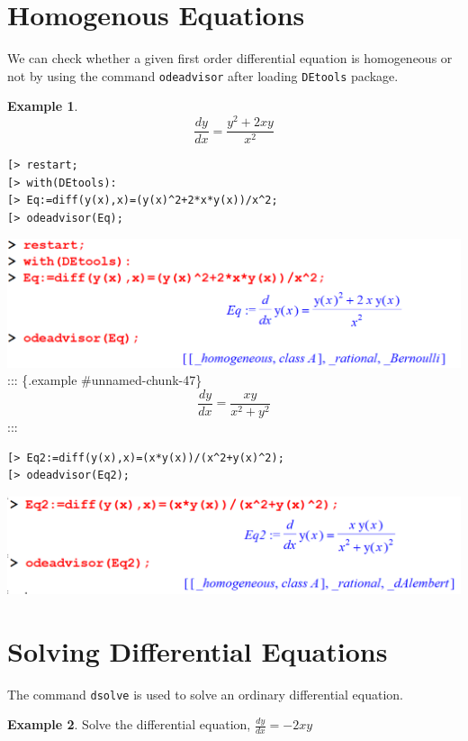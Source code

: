 \documentclass[
]{book}
\theoremstyle{definition}
\theoremstyle{definition}
\newtheorem{example}{Example}[chapter]
\theoremstyle{definition}
\theoremstyle{definition}
\theoremstyle{remark}
\begin{document}
\section{Homogenous Equations}\label{homogenous-equations}

We can check whether a given first order differential equation is homogeneous or not by using the command \texttt{odeadvisor} after loading \texttt{DEtools} package.

\begin{example}
\protect\hypertarget{exm:unnamed-chunk-46}{}\label{exm:unnamed-chunk-46}\[\frac{dy}{dx} = \frac{y^2+2xy}{x^2}\]
\end{example}

\begin{verbatim}
[> restart;
[> with(DEtools):
[> Eq:=diff(y(x),x)=(y(x)^2+2*x*y(x))/x^2;
[> odeadvisor(Eq);
\end{verbatim}

\includegraphics{figures/Diff/Diff 6.2 -4.png}
::: \{.example \#unnamed-chunk-47\}
\[\frac{dy}{dx} = \frac{xy}{x^2+y^2}\]
:::

\begin{verbatim}
[> Eq2:=diff(y(x),x)=(x*y(x))/(x^2+y(x)^2);
[> odeadvisor(Eq2);
\end{verbatim}

\includegraphics{figures/Diff/Diff 6.2 -5.png}

\section{Solving Differential Equations}\label{solving-differential-equations}

The command \texttt{dsolve} is used to solve an ordinary differential equation.

\begin{example}
\protect\hypertarget{exm:unnamed-chunk-48}{}\label{exm:unnamed-chunk-48}Solve the differential equation, \(\frac{dy}{dx} = -2xy\)
\end{example}
\end{document}
